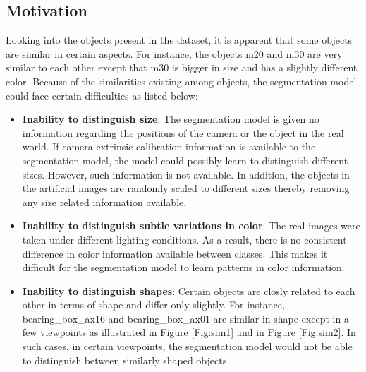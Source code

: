 	\subsection{Motivation}
		Looking into the objects present in the dataset, it is apparent that some objects are similar in certain aspects. For instance, the objects m20 and m30 are very similar to each other except that m30 is bigger in size and has a slightly different color. Because of the similarities existing among objects, the segmentation model could face certain difficulties as listed below:
		\begin{itemize}
			\item \textbf{Inability to distinguish size}: The segmentation model is given no information regarding the positions of the camera or the object in the real world. If camera extrinsic calibration information is available to the segmentation model, the model could possibly learn to distinguish different sizes. However, such information is not available. In addition, the objects in the artificial images are randomly scaled to different sizes thereby removing any size related information available.
			\item \textbf{Inability to distinguish subtle variations in color}: The real images were taken under different lighting conditions. As a result, there is no consistent difference in color information available between classes. This makes it difficult for the segmentation model to learn patterns in color information.
			\item \textbf{Inability to distinguish shapes}: Certain objects are closly related to each other in terms of shape and differ only slightly. For instance, bearing\_box\_ax16 and bearing\_box\_ax01 are similar in shape except in a few viewpoints as illustrated in Figure \ref{Fig:sim1} and in Figure \ref{Fig:sim2}. In such cases, in certain viewpoints, the segmentation model would not be able to distinguish between similarly shaped objects.
			

\end{itemize}
